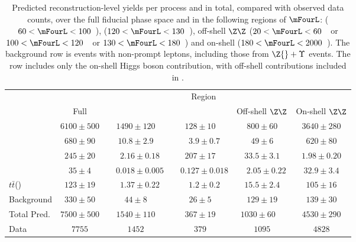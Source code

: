 \begin{table}
    \centering    
    \caption{Predicted reconstruction-level yields per process and in total,
      compared with observed data counts, over the full fiducial phase space and in the
      following regions of
      $\mFourL$: \ZFourL{}  ($60 < \mFourL < 100$~\GeV), \HFourL{}  ($120 <
\mFourL < 130$~\GeV), off-shell $\Z\Z$  ($20 <
\mFourL < 60$~\GeV\ or $100 <
\mFourL < 120$~\GeV\ or $130 <
\mFourL < 180$~\GeV) and  on-shell \Z\Z{} ($180 <
\mFourL < 2000$~\GeV).
     The background row is events with non-prompt leptons,
     including those from $\Z{} + \Upsilon{}$ events.
      The \HFourL{} row includes only the
      on-shell Higgs boson contribution, with off-shell contributions included in
     \ggFourL{}. \label{tab:RecoYieldTablePerProcess} }
  \begin{tabular} {l  c  c  c  c  c }
 \hline 
  & \multicolumn{5}{c}{Region} \\
      & Full   & \ZFourL{}  & \HFourL{}  & Off-shell $\Z\Z$  & On-shell $\Z\Z$   \\

 \hline 
\qqFourL{} & $6100 \pm 500$  & $1490 \pm 120$  & $128 \pm 10$  & $800 \pm 60$  & $3640 \pm 280$ \\
\ggFourL{} & $680 \pm 90$  & $10.8 \pm 2.9$  & ~~$3.9 \pm 0.7$  & $49 \pm 6$  & $620 \pm 80$ \\
\HFourL{}  & $245 \pm 20$  & ~~$2.16 \pm 0.18$  & $207 \pm 17$  & $33.5 \pm 3.1$  & $1.98 \pm 0.20$ \\
\V\V\V{}  & $35 \pm 4$  & ~~$0.018 \pm 0.005$  & ~~$0.127 \pm 0.018$  & ~~$2.05 \pm 0.22$  & $32.9 \pm 3.4$ \\
$t\bar{t}$\V(\V) & $123 \pm 19$  & ~~$1.37 \pm 0.22$  & ~~$1.2 \pm 0.2$  & $15.5 \pm 2.4$  & $105 \pm 16$ \\
Background & $330 \pm 50$  & $44 \pm 8$  & $26 \pm 5$  & $129 \pm 19$  & $139 \pm 30$ \\    
\hline 
Total Pred. & $7500 \pm 500$  & $1540 \pm 110$  & $367 \pm 19$  & $1030 \pm 60$~~  & $4530 \pm 290$ \\
\hline 
Data & $7755 $  & $1452 $  & $379 $  & $1095 $  & $4828 $ \\
 \hline 
 \end{tabular}
\end{table}

